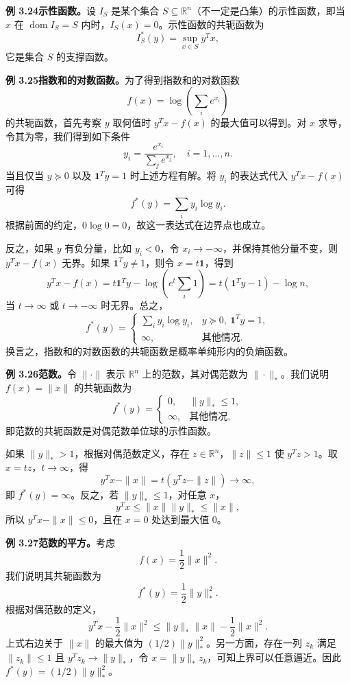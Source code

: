 \documentclass[UTF8,12pt,a4paper,fontset=fandol]{ctexart}
\DeclareMathOperator{\dom}{dom}
\begin{document}
\noindent\textbf{例 3.24\quad 示性函数。}\quad 设 $I_S$ 是某个集合 $S\subseteq\mathbb{R}^n$（不一定是凸集）的示性函数，即当 $x$ 在 $\dom I_S=S$ 内时，$I_S(x)=0$。示性函数的共轭函数为
\[
I_S^*(y)=\sup_{x\in S}y^Tx,
\]
它是集合 $S$ 的支撑函数。

\noindent\textbf{例 3.25\quad 指数和的对数函数。}\quad 为了得到指数和的对数函数
\[
f(x)=\log\left(\sum_i e^{x_i}\right)
\]
的共轭函数，首先考察 $y$ 取何值时 $y^Tx-f(x)$ 的最大值可以得到。对 $x$ 求导，令其为零，我们得到如下条件
\[
y_i=\frac{e^{x_i}}{\sum_j e^{x_j}},\quad i=1,\ldots,n.
\]
当且仅当 $y\succeq0$ 以及 $\mathbf{1}^Ty=1$ 时上述方程有解。将 $y_i$ 的表达式代入 $y^Tx-f(x)$ 可得
\[
f^*(y)=\sum_i y_i\log y_i.
\]
根据前面的约定，$0\log0=0$，故这一表达式在边界点也成立。

反之，如果 $y$ 有负分量，比如 $y_i<0$，令 $x_i\to-\infty$，并保持其他分量不变，则 $y^Tx-f(x)$ 无界。如果 $\mathbf{1}^Ty\neq1$，则令 $x=t\mathbf{1}$，得到
\[
y^Tx-f(x)=t\mathbf{1}^Ty-\log\left(e^t\sum_i1\right)
=t(\mathbf{1}^Ty-1)-\log n,
\]
当 $t\to\infty$ 或 $t\to-\infty$ 时无界。总之，
\[
f^*(y)=
\begin{cases}
\sum_i y_i\log y_i, & y\succeq0,\ \mathbf{1}^Ty=1,\\
\infty, & \text{其他情况}.
\end{cases}
\]
换言之，指数和的对数函数的共轭函数是概率单纯形内的负熵函数。

\noindent\textbf{例 3.26\quad 范数。}\quad 令 $\|\cdot\|$ 表示 $\mathbb{R}^n$ 上的范数，其对偶范数为 $\|\cdot\|_*$。我们说明 $f(x)=\|x\|$ 的共轭函数为
\[
f^*(y)=
\begin{cases}
0, & \|y\|_*\leq1,\\
\infty, & \text{其他情况},
\end{cases}
\]
即范数的共轭函数是对偶范数单位球的示性函数。

如果 $\|y\|_*>1$，根据对偶范数定义，存在 $z\in\mathbb{R}^n$，$\|z\|\leq1$ 使 $y^Tz>1$。取 $x=tz$，$t\to\infty$，得
\[
y^Tx-\|x\|=t(y^Tz-\|z\|)\to\infty,
\]
即 $f^*(y)=\infty$。反之，若 $\|y\|_*\leq1$，对任意 $x$，
\[
y^Tx\leq\|x\|\|y\|_*\leq\|x\|,
\]
所以 $y^Tx-\|x\|\leq0$，且在 $x=0$ 处达到最大值 $0$。

\noindent\textbf{例 3.27\quad 范数的平方。}\quad 考虑
\[
f(x)=\frac{1}{2}\|x\|^2.
\]
我们说明其共轭函数为
\[
f^*(y)=\frac{1}{2}\|y\|_*^2.
\]
根据对偶范数的定义，
\[
y^Tx-\frac{1}{2}\|x\|^2\leq\|y\|_*\|x\|-\frac{1}{2}\|x\|^2.
\]
上式右边关于 $\|x\|$ 的最大值为 $(1/2)\|y\|_*^2$。另一方面，存在一列 $z_k$ 满足 $\|z_k\|\leq1$ 且 $y^Tz_k\to\|y\|_*$，令 $x=\|y\|_*z_k$，可知上界可以任意逼近。因此 $f^*(y)=(1/2)\|y\|_*^2$。
\end{document}
